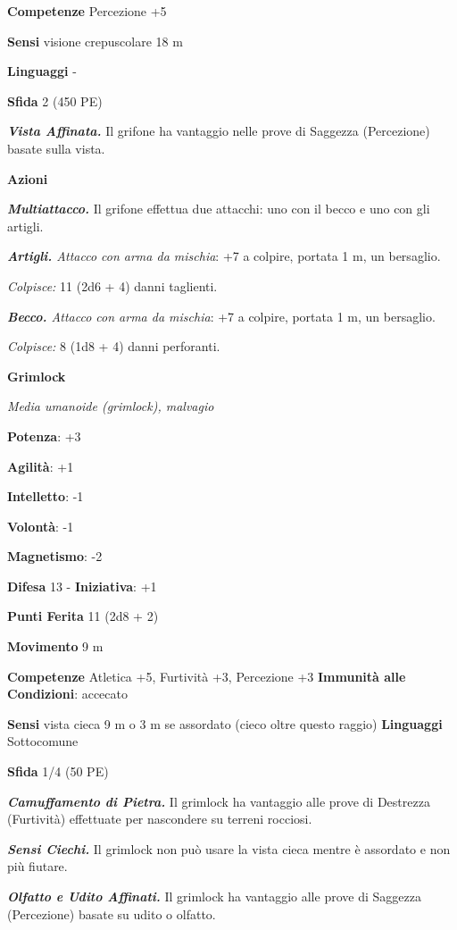 \begin{multicols}{2}
\textbf{Competenze} Percezione +5

\textbf{Sensi} visione crepuscolare 18 m

\textbf{Linguaggi} -

\textbf{Sfida} 2 (450 PE)\smallskip

\emph{\textbf{Vista Affinata.}} Il grifone ha vantaggio nelle prove di
Saggezza (Percezione) basate sulla vista.

\smallskip\textbf{Azioni}

\emph{\textbf{Multiattacco.}} Il grifone effettua due attacchi: uno con
il becco e uno con gli artigli.

\emph{\textbf{Artigli.} Attacco con arma da mischia}: +7 a colpire,
portata 1 m, un bersaglio.

\emph{Colpisce:} 11 (2d6 + 4) danni taglienti.

\emph{\textbf{Becco.} Attacco con arma da mischia}: +7 a colpire,
portata 1 m, un bersaglio.

\emph{Colpisce:} 8 (1d8 + 4) danni perforanti.

\textbf{Grimlock}

\emph{Media umanoide (grimlock), malvagio}

\textbf{Potenza}: +3

\textbf{Agilità}: +1

\textbf{Intelletto}: -1

\textbf{Volontà}: -1

\textbf{Magnetismo}: -2

\textbf{Difesa} 13 - \textbf{Iniziativa}: +1

\textbf{Punti Ferita} 11 (2d8 + 2)

\textbf{Movimento} 9 m

\textbf{Competenze} Atletica +5, Furtività +3, Percezione +3
\textbf{Immunità alle Condizioni}: accecato

\textbf{Sensi} vista cieca 9 m o 3 m se assordato (cieco oltre questo
raggio) \textbf{Linguaggi} Sottocomune

\textbf{Sfida} 1/4 (50 PE)\smallskip

\emph{\textbf{Camuffamento di Pietra.}} Il grimlock ha vantaggio alle
prove di Destrezza (Furtività) effettuate per nascondere su terreni
rocciosi.

\emph{\textbf{Sensi Ciechi.}} Il grimlock non può usare la vista cieca
mentre è assordato e non più fiutare.

\emph{\textbf{Olfatto e Udito Affinati.}} Il grimlock ha vantaggio alle
prove di Saggezza (Percezione) basate su udito o olfatto.


\end{multicols}
